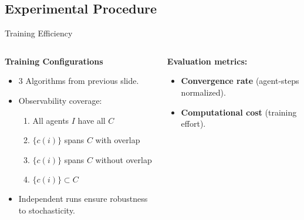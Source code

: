 \subsection{Experimental Procedure}

\begin{frame}{Training Efficiency}
\begin{columns}
    \begin{column}{0.5\linewidth}
        \textbf{Training Configurations}
            \begin{itemize}
                \item 3 Algorithms from previous slide.
                \item Observability coverage:
                    \begin{enumerate}
                        \item All agents \(I\) have all \(C\)
                        \item \(\{c(i)\}\) spans \(C\) with overlap
                        \item \(\{c(i)\}\) spans \(C\) without overlap
                        \item \(\{c(i)\} \subset C\) 
                    \end{enumerate}
                \item Independent runs ensure robustness to stochasticity.
            \end{itemize}
    \end{column}
    \begin{column}{0.5\linewidth}
        \textbf{Evaluation metrics:}
            \begin{itemize}
                \item \textbf{Convergence rate} (agent-steps normalized).
                \item \textbf{Computational cost} (training effort).
            \end{itemize}
    \end{column}
\end{columns}
\end{frame}





